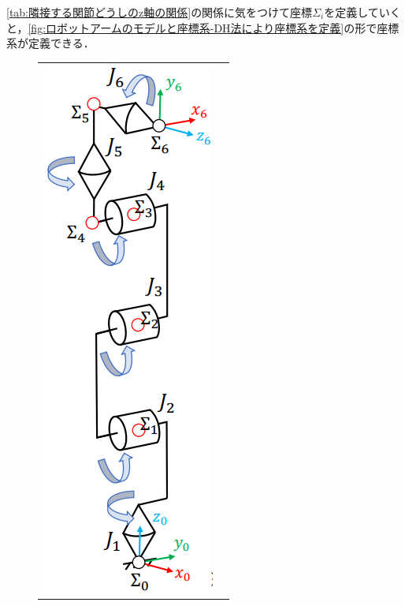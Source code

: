 \documentclass{ltjsarticle}
\begin{document}
\cref{tab:隣接する関節どうしのz軸の関係}の関係に気をつけて座標$\Sigma_i$を定義していくと，\cref{fig:ロボットアームのモデルと座標系-DH法により座標系を定義}の形で座標系が定義できる．
\begin{figure}[H]
	\centering
	\begin{tabular}{cc}
		\begin{minipage}[c]{0.48\linewidth}
			\centering
			\includegraphics[width = 0.7\linewidth]{../figures/robot_arm_0.png}

\end{minipage}
\end{tabular}
\end{figure}
\end{document}
